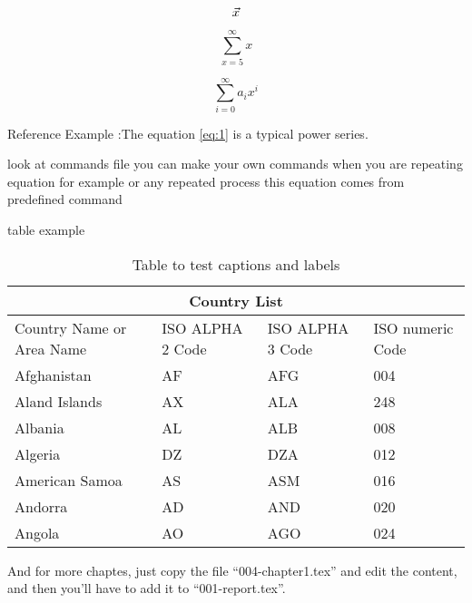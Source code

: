 \begin{equation}
\Large \vec{x}
\end{equation}

\begin{equation}
\displaystyle {\sum \limits_{x = 5} ^{\infty} x}
\end{equation}

\begin{equation} \label{eq:1}
\sum_{i=0}^{\infty} a_i x^i
\end{equation}
 
Reference Example :The equation \ref{eq:1} is a typical power series.

look at commands file you can make your own commands when you are repeating equation for example or any repeated process 
this equation comes from predefined command
\komyCommand

table example\\
\begin{table}[H] \centering %

\begin{tabular}{ |p{3cm}||p{3cm}|p{3cm}|p{3cm}|  }
 \hline
 \multicolumn{4}{|c|}{Country List} \\
 \hline
 
 Country Name     or Area Name& ISO ALPHA 2 Code &ISO ALPHA 3 Code&ISO numeric Code\\
 \hline
 Afghanistan   & AF    &AFG&   004\\
 Aland Islands&   AX  & ALA   &248\\
 Albania &AL & ALB&  008\\
 Algeria    &DZ & DZA&  012\\
 American Samoa&   AS  & ASM&016\\
 Andorra& AD  & AND   &020\\
 Angola& AO  & AGO&024\\
 \hline
 
\end{tabular}

\caption{Table to test captions and labels}
\label{table:1}

\end{table}

And for more chaptes, just copy the file ``004-chapter1.tex'' and edit the content, and then you'll have to add it to ``001-report.tex''.
